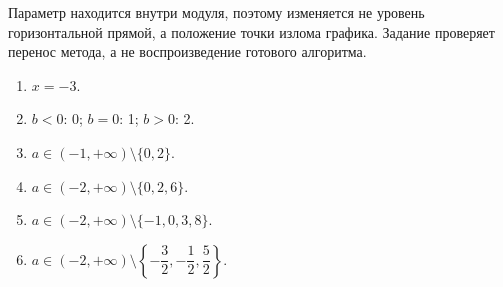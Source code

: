 \begin{criterionbox}
  Параметр находится внутри модуля, поэтому изменяется не уровень
  горизонтальной прямой, а положение точки излома графика. Задание проверяет
  перенос метода, а не воспроизведение готового алгоритма.
\end{criterionbox}

\begin{resultbox}
  \begin{enumerate}[itemsep=0.28em,topsep=0.25em]
    \item \(x=-3\).
    \item \(b<0\): 0; \(b=0\): 1; \(b>0\): 2.
    \item \(a\in(-1,+\infty)\setminus\{0,2\}\).
    \item \(a\in(-2,+\infty)\setminus\{0,2,6\}\).
    \item \(a\in(-2,+\infty)\setminus\{-1,0,3,8\}\).
    \item \(a\in(-2,+\infty)\setminus
      \left\{-\dfrac32,-\dfrac12,\dfrac52\right\}\).
  \end{enumerate}
\end{resultbox}
